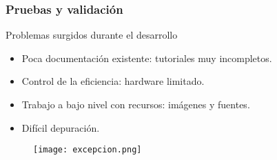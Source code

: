 \begin{frame}
\frametitle{Pruebas y validación}
	\begin{block}{Problemas surgidos durante el desarrollo}
		\begin{itemize}
			\item Poca documentación existente: tutoriales muy incompletos.
			\item Control de la eficiencia: hardware limitado.
			\item Trabajo a bajo nivel con recursos: imágenes y fuentes.
			\item Difícil depuración.
		\end{itemize}
	\end{block}
	\begin{figure}[H]
		\label{excepcion}
		\begin{center}
		\texttt{[image: excepcion.png]}
		\end{center}
	\end{figure}
\end{frame}

